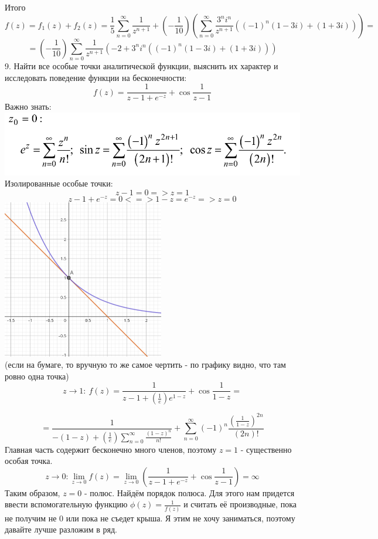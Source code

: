 \documentclass[14pt]{extarticle}
\begin{document}
Итого\\
$$f(z)= f_1(z) + f_2(z) = 
\frac{1}{5} \sum_{n=0}^{\infty}\frac{1}{z^{n+1}} + 
\left(-\frac{1}{10}\right) 
\left(\sum_{n=0}^{\infty}\frac{3^n i^n}{z^{n+1}}
((-1)^n(1-3i)+(1+3i))\right)=$$
$$=\left(-\frac{1}{10}\right)\sum_{n=0}^{\infty}
\frac{1}{z^{n+1}}\left(-2+3^n i^n((-1)^n(1-3i)+(1+3i))\right)$$
9. Найти все особые точки аналитической функции, выяснить их
характер и исследовать поведение функции на бесконечности:
$$f(z)=\frac{1}{z-1+e^{-z}}+\cos{\frac{1}{z-1}}$$
Важно знать:\\
\includegraphics[width=400pt]{img7.png} \\
Изолированные особые точки: 
$$z-1=0 => z=1$$
$$z-1+e^{-z}=0 <=> 1-z = e^{-z} => z=0$$
\includegraphics[width=200pt]{img6.png} \\
(если на бумаге, то вручную то же самое чертить - по графику видно,
что там ровно одна точка)
$$z\to 1: \ f(z) = \frac{1}{z-1 + \left(\frac{1}{e}\right)e^{1-z}}
+ \cos{\frac{1}{1-z}} = $$

$$=\frac{1}{-(1-z) + \left(\frac{1}{e}\right)\sum_{n=0}^{\infty}
\frac{(1-z)^n}{n!}}
+ \sum_{n=0}^{\infty}(-1)^n\frac{(\frac{1}{1-z})^{2n}}{(2n)!}$$
Главная часть содержит бесконечно много членов, поэтому $z=1$ -
существенно особая точка.
$$z\to 0: \lim_{z\to 0}f(z) = \lim_{z\to 0} \left(
\frac{1}{z-1+e^{-z}}+\cos{\frac{1}{z-1}}\right)=\infty$$
Таким образом, $z=0$ - полюс. Найдём порядок полюса. 
Для этого нам придется ввести вспомогательную функцию $\phi(z) = 
\frac{1}{f(z)}$ и считать её производные, пока не получим не 0 или 
пока не съедет крыша. Я этим не хочу заниматься, поэтому давайте лучше 
разложим в ряд. 
\end{document}

